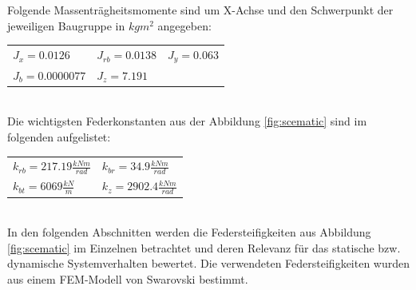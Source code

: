 \documentclass[10pt,a4paper]{iace.report}
\begin{document}
					Folgende Massenträgheitsmomente sind um X-Achse und den Schwerpunkt der jeweiligen Baugruppe in $ kgm^{2} $ angegeben: \\\vspace{10pt} \def\arraystretch{1.2}
					\begin{tabular}{lll}
						$ J_{x}=0.0126 $ & $ J_{rb}=0.0138 $ & $ J_{y} = 0.063 $ \\ 
						$ J_{b}=0.0000077 $  & $ J_{z}=7.191 $&  \\
					\end{tabular}\leavevmode\\
					Die wichtigsten Federkonstanten aus der Abbildung \ref{fig:scematic} sind im folgenden aufgelistet: \\\vspace{10pt} \def\arraystretch{1.3}
					\begin{tabular}{ll}
						$ k_{rb}=217.19\frac{kNm}{rad} $ & $ k_{br}=34.9\frac{kNm}{rad} $ \\ 
						$ k_{bt}=6069\frac{kN}{m} $ & $ k_{z}=2902.4\frac{kNm}{rad} $ \\   
					\end{tabular}\leavevmode\\
				In den folgenden Abschnitten werden die Federsteifigkeiten aus Abbildung \ref{fig:scematic} im Einzelnen betrachtet und deren Relevanz für das statische bzw. dynamische Systemverhalten bewertet. Die verwendeten Federsteifigkeiten wurden aus einem FEM-Modell von Swarovski bestimmt.
\end{document}
